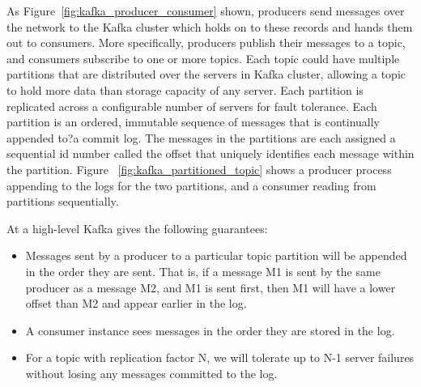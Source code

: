 As Figure~\ref{fig:kafka_producer_consumer} shown, producers send messages over the network to the Kafka cluster which holds on to these records and hands them out to consumers. More specifically, producers publish their messages to a topic, and consumers subscribe to one or more topics. Each topic could have multiple partitions that are distributed over the servers in Kafka cluster, allowing a topic to hold more data than storage capacity of any server. Each partition is replicated across a configurable number of servers for fault tolerance. Each partition is an ordered, immutable sequence of messages that is continually appended to?a commit log. The messages in the partitions are each assigned a sequential id number called the offset that uniquely identifies each message within the partition.  Figure ~\ref{fig:kafka_partitioned_topic} shows a producer process appending to the logs for the two partitions, and a consumer reading from partitions sequentially. 

At a high-level Kafka gives the following guarantees: \cite{Kafka}
\begin{itemize}
  \item Messages sent by a producer to a particular topic partition will be appended in the order they are sent. That is, if a message M1 is sent by the same producer as a message M2, and M1 is sent first, then M1 will have a lower offset than M2 and appear earlier in the log. 
  \item A consumer instance sees messages in the order they are stored in the log.
  \item For a topic with replication factor N, we will tolerate up to N-1 server failures without losing any messages committed to the log.
\end{itemize}


